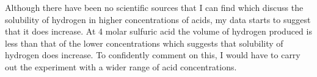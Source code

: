 Although there have been no scientific sources that I can find which discuss the solubility of hydrogen in higher concentrations of acids, my data starts to suggest that it does increase. At 4 molar sulfuric acid the volume of hydrogen produced is less than that of the lower concentrations which suggests that solubility of hydrogen does increase. To confidently comment on this, I would have to carry out the experiment with a wider range of acid concentrations. 